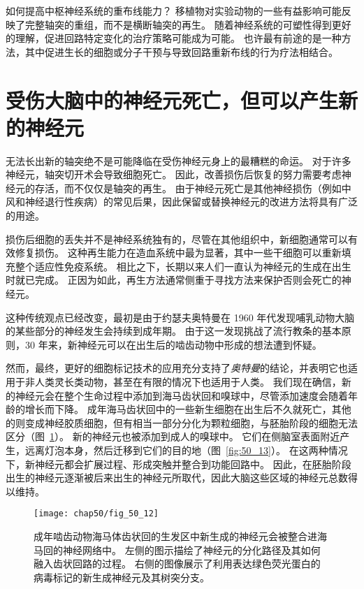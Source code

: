 如何提高中枢神经系统的重布线能力？
移植物对实验动物的一些有益影响可能反映了完整轴突的重组，而不是横断轴突的再生。
随着神经系统的可塑性得到更好的理解，促进回路特定变化的治疗策略可能成为可能。
也许最有前途的是一种方法，其中促进生长的细胞或分子干预与导致回路重新布线的行为疗法相结合。



\section{受伤大脑中的神经元死亡，但可以产生新的神经元}

无法长出新的轴突绝不是可能降临在受伤神经元身上的最糟糕的命运。
对于许多神经元，轴突切开术会导致细胞死亡。
因此，改善损伤后恢复的努力需要考虑神经元的存活，而不仅仅是轴突的再生。
由于神经元死亡是其他神经损伤（例如中风和神经退行性疾病）的常见后果，因此保留或替换神经元的改进方法将具有广泛的用途。


损伤后细胞的丢失并不是神经系统独有的，尽管在其他组织中，新细胞通常可以有效修复损伤。
这种再生能力在造血系统中最为显著，其中一些干细胞可以重新填充整个适应性免疫系统。
相比之下，长期以来人们一直认为神经元的生成在出生时就已完成。
正因为如此，再生方法通常侧重于寻找方法来保护否则会死亡的神经元。


这种传统观点已经改变，最初是由于约瑟夫奥特曼在 1960 年代发现哺乳动物大脑的某些部分的神经发生会持续到成年期。
由于这一发现挑战了流行教条的基本原则，30 年来，新神经元可以在出生后的啮齿动物中形成的想法遭到怀疑。


然而，最终，更好的细胞标记技术的应用充分支持了\textit{奥特曼}的结论，并表明它也适用于非人类灵长类动物，甚至在有限的情况下也适用于人类。
我们现在确信，新的神经元会在整个生命过程中添加到海马齿状回和嗅球中，尽管添加速度会随着年龄的增长而下降。
成年海马齿状回中的一些新生细胞在出生后不久就死亡，其他的则变成神经胶质细胞，但有相当一部分分化为颗粒细胞，与胚胎阶段的细胞无法区分（图~\ref{fig:50_12}）。
新的神经元也被添加到成人的嗅球中。
它们在侧脑室表面附近产生，远离灯泡本身，然后迁移到它们的目的地（图~\ref{fig:50_13}）。
在这两种情况下，新神经元都会扩展过程、形成突触并整合到功能回路中。
因此，在胚胎阶段出生的神经元逐渐被后来出生的神经元所取代，因此大脑这些区域的神经元总数得以维持。



\begin{figure}[htbp]
	\centering
	\texttt{[image: chap50/fig\_50\_12]}
	\caption{成年啮齿动物海马体齿状回的生发区中新生成的神经元会被整合进海马回的神经网络中。
		左侧的图示描绘了神经元的分化路径及其如何融入齿状回路的过程。
		右侧的图像展示了利用表达绿色荧光蛋白的病毒标记的新生成神经元及其树突分支。}
	\label{fig:50_12}
\end{figure}


